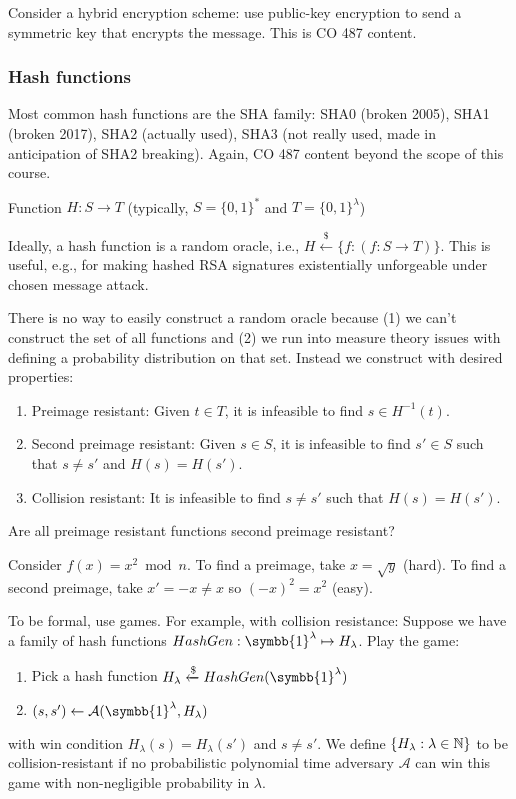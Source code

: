 \documentclass[notes]{agony}
\newcommand{\xgets}{\xleftarrow}
\newcommand{\one}{\symbb{1}}
\begin{document}
Consider a hybrid encryption scheme:
use public-key encryption to send a symmetric key that encrypts the message.
This is CO 487 content.

\subsubsection*{Hash functions}

Most common hash functions are the SHA family:
SHA0 (broken 2005), SHA1 (broken 2017), SHA2 (actually used),
SHA3 (not really used, made in anticipation of SHA2 breaking).
Again, CO 487 content beyond the scope of this course.

\begin{defn}
  Function $H : S \to T$ (typically, $S = \{0,1\}^*$ and $T = \{0,1\}^\lambda$)
\end{defn}

Ideally, a hash function is a random oracle, i.e.,
$H \xgets{\$} \{ f : (f : S \to T) \}$.
This is useful, e.g., for making hashed RSA signatures
existentially unforgeable under chosen message attack.

There is no way to easily construct a random oracle
because (1) we can't construct the set of all functions and
(2) we run into measure theory issues with defining a probability distribution on that set.
Instead we construct with desired properties:
\begin{enumerate}[1.]
  \item Preimage resistant: Given $t \in T$, it is infeasible to find $s \in H^{-1}(t)$.
  \item Second preimage resistant: Given $s \in S$, it is infeasible to find
        $s' \in S$ such that $s \neq s'$ and $H(s) = H(s')$.
  \item Collision resistant: It is infeasible to find $s \neq s'$
        such that $H(s) = H(s')$.
\end{enumerate}

\begin{example}
  Are all preimage resistant functions second preimage resistant?
\end{example}
\begin{sol}
  Consider $f(x) = x^2 \bmod n$.
  To find a preimage, take $x = \sqrt{y}$ (hard).
  To find a second preimage, take $x' = -x \neq x$ so $(-x)^2 = x^2$ (easy).
\end{sol}

To be formal, use games.
For example, with collision resistance:
Suppose we have a family of hash functions $HashGen : \one^\lambda \mapsto H_\lambda$.
Play the game:
\begin{enumerate}[1.]
  \item Pick a hash function $H_\lambda \xgets{\$} HashGen(\one^\lambda)$
  \item $(s, s') \gets \mathcal A(\one^\lambda, H_\lambda)$
\end{enumerate}
with win condition $H_\lambda(s) = H_\lambda(s')$ and $s \neq s'$.
We define $\{H_\lambda : \lambda \in \mathbb{N}\}$
to be collision-resistant if no probabilistic polynomial time adversary $\mathcal A$
can win this game with non-negligible probability in $\lambda$.
\end{document}
